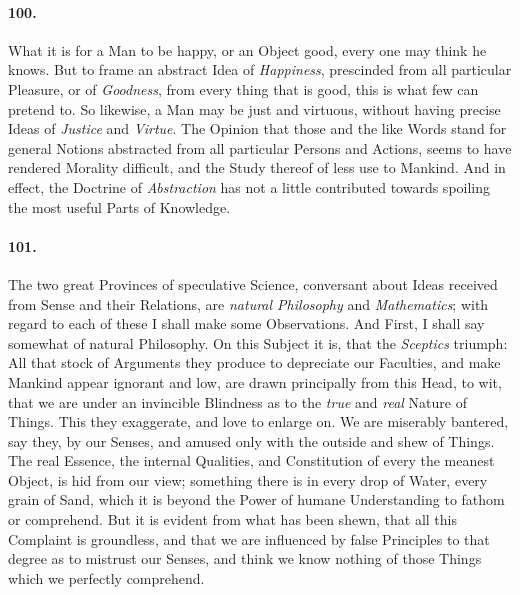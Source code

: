 \documentclass[]{article}
\newenvironment{sectionbody}{}{}
\begin{document}
\begin{sectionbody}
\paragraph{100.} What it is for a Man to be happy, or an Object good, every one
may think he knows.  But to frame an abstract Idea of
\emph{Happiness}, prescinded from all particular Pleasure, or
of \emph{Goodness}, from every thing that is good, this is what
few can pretend to.  So likewise, a Man may be just and virtuous,
without having precise Ideas of \emph{Justice} and
\emph{Virtue}.  The Opinion that those and the like Words stand
for general Notions abstracted from all particular Persons and
Actions, seems to have rendered Morality difficult, and the
Study thereof of less use to Mankind.  And in effect, the
Doctrine of \emph{Abstraction} has not a little contributed
towards spoiling the most useful Parts of Knowledge.



\paragraph{101.} The two great Provinces of speculative Science, conversant about
Ideas received from Sense and their Relations, are \emph{natural
Philosophy} and \emph{Mathematics}; with regard to each of
these I shall make some Observations.  And First, I shall say
somewhat of natural Philosophy.  On this Subject it is, that the
\emph{Sceptics} triumph: All that stock of Arguments they
produce to depreciate our Faculties, and make Mankind appear
ignorant and low, are drawn principally from this Head, to wit,
that we are under an invincible Blindness as to the \emph{true}
and \emph{real} Nature of Things.  This they exaggerate, and
love to enlarge on.  We are miserably bantered, say they, by our
Senses, and amused only with the outside and shew of Things.  The
real Essence, the internal Qualities, and Constitution of every
the meanest Object, is hid from our view; something there is in
every drop of Water, every grain of Sand, which it is beyond the
Power of humane Understanding to fathom or comprehend.  But it is
evident from what has been shewn, that all this Complaint is
groundless, and that we are influenced by false Principles to
that degree as to mistrust our Senses, and think we know nothing
of those Things which we perfectly comprehend.




\end{sectionbody}
\end{document}
